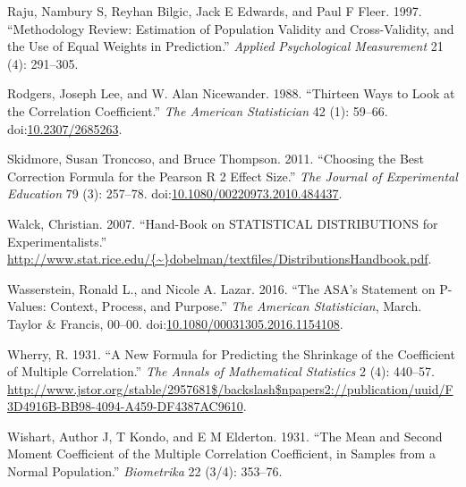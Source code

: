\documentclass[]{article}
\begin{document}
\hypertarget{ref-Raju1997}{}
Raju, Nambury S, Reyhan Bilgic, Jack E Edwards, and Paul F Fleer. 1997.
``Methodology Review: Estimation of Population Validity and
Cross-Validity, and the Use of Equal Weights in Prediction.''
\emph{Applied Psychological Measurement} 21 (4): 291--305.

\hypertarget{ref-Rodgers1988}{}
Rodgers, Joseph Lee, and W. Alan Nicewander. 1988. ``Thirteen Ways to
Look at the Correlation Coefficient.'' \emph{The American Statistician}
42 (1): 59--66.
doi:\href{https://doi.org/10.2307/2685263}{10.2307/2685263}.

\hypertarget{ref-Skidmore2011}{}
Skidmore, Susan Troncoso, and Bruce Thompson. 2011. ``Choosing the Best
Correction Formula for the Pearson R 2 Effect Size.'' \emph{The Journal
of Experimental Education} 79 (3): 257--78.
doi:\href{https://doi.org/10.1080/00220973.2010.484437}{10.1080/00220973.2010.484437}.

\hypertarget{ref-Walck2007}{}
Walck, Christian. 2007. ``Hand-Book on STATISTICAL DISTRIBUTIONS for
Experimentalists.''
\href{http://www.stat.rice.edu/\%7B~\%7Ddobelman/textfiles/DistributionsHandbook.pdf}{http://www.stat.rice.edu/\{\textasciitilde{}\}dobelman/textfiles/DistributionsHandbook.pdf}.

\hypertarget{ref-Wasserstein2016}{}
Wasserstein, Ronald L., and Nicole A. Lazar. 2016. ``The ASA's Statement
on P-Values: Context, Process, and Purpose.'' \emph{The American
Statistician}, March. Taylor \& Francis, 00--00.
doi:\href{https://doi.org/10.1080/00031305.2016.1154108}{10.1080/00031305.2016.1154108}.

\hypertarget{ref-Wherry1931}{}
Wherry, R. 1931. ``A New Formula for Predicting the Shrinkage of the
Coefficient of Multiple Correlation.'' \emph{The Annals of Mathematical
Statistics} 2 (4): 440--57.
\url{http://www.jstor.org/stable/2957681$/backslash$npapers2://publication/uuid/F3D4916B-BB98-4094-A459-DF4387AC9610}.

\hypertarget{ref-Wishart1931}{}
Wishart, Author J, T Kondo, and E M Elderton. 1931. ``The Mean and
Second Moment Coefficient of the Multiple Correlation Coefficient, in
Samples from a Normal Population.'' \emph{Biometrika} 22 (3/4): 353--76.
\end{document}
